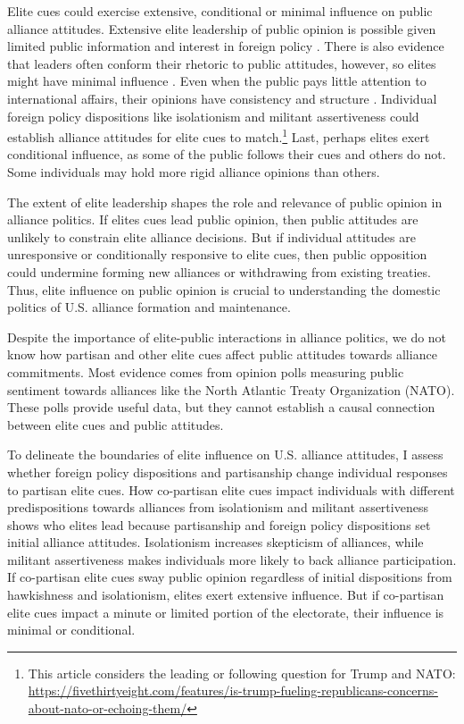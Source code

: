 \documentclass[12pt]{article}
\begin{document}
Elite cues could exercise extensive, conditional or minimal influence on public alliance attitudes. 
Extensive elite leadership of public opinion is possible given limited public information and interest in foreign policy \citep{Canes-Wrone2006, BaumPotter2008, Druckman2014}.
There is also evidence that leaders often conform their rhetoric to public attitudes, however, so elites might have minimal influence  \citep{Barberaetal2019, HagerHilbig2020}.
Even when the public pays little attention to international affairs, their opinions have consistency and structure \citep{Holsti1992, PageShapiro1992}.
Individual foreign policy dispositions like isolationism and militant assertiveness \citep{Herrmannetal1999, KertzerZeitzoff2017} could establish alliance attitudes for elite cues to match.\footnote{This article considers the leading or following question for Trump and NATO: \url{https://fivethirtyeight.com/features/is-trump-fueling-republicans-concerns-about-nato-or-echoing-them/}}
Last, perhaps elites exert conditional influence, as some of the public follows their cues and others do not. 
Some individuals may hold more rigid alliance opinions than others.


The extent of elite leadership shapes the role and relevance of public opinion in alliance politics.
If elites cues lead public opinion, then public attitudes are unlikely to constrain elite alliance decisions.
But if individual attitudes are unresponsive or conditionally responsive to elite cues, then public opposition could undermine forming new alliances or withdrawing from existing treaties. 
Thus, elite influence on public opinion is crucial to understanding the domestic politics of U.S. alliance formation and maintenance.  


Despite the importance of elite-public interactions in alliance politics, we do not know how partisan and other elite cues affect public attitudes towards alliance commitments. 
Most evidence comes from opinion polls measuring public sentiment towards alliances like the North Atlantic Treaty Organization (NATO).
These polls provide useful data, but they cannot establish a causal connection between elite cues and public attitudes.


To delineate the boundaries of elite influence on U.S. alliance attitudes, I assess whether foreign policy dispositions and partisanship change individual responses to partisan elite cues.
How co-partisan elite cues impact individuals with different predispositions towards alliances from isolationism and militant assertiveness shows who elites lead because partisanship and foreign policy dispositions set initial alliance attitudes. 
Isolationism increases skepticism of alliances, while militant assertiveness makes individuals more likely to back alliance participation. 
If co-partisan elite cues sway public opinion regardless of initial dispositions from hawkishness and isolationism, elites exert extensive influence. 
But if co-partisan elite cues impact a minute or limited portion of the electorate, their influence is minimal or conditional.
\end{document}
